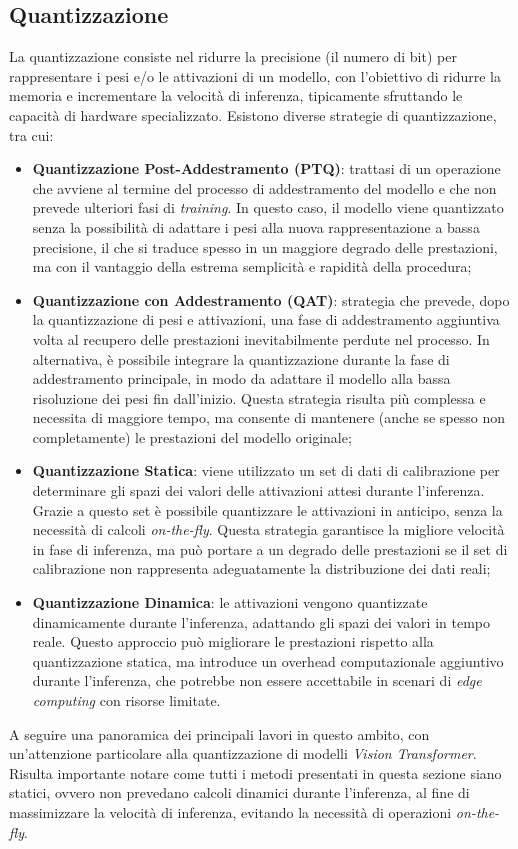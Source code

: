 \subsection{Quantizzazione}
La quantizzazione consiste nel ridurre la precisione (il numero di bit) per
rappresentare i pesi e/o le attivazioni di un modello, con l'obiettivo di
ridurre la memoria e incrementare la velocità di inferenza, tipicamente
sfruttando le capacità di hardware specializzato. Esistono diverse strategie di
quantizzazione, tra cui:
\begin{itemize}
    \item \textbf{Quantizzazione Post-Addestramento (PTQ)}: trattasi di un operazione che avviene al termine del processo di addestramento del modello e che non prevede ulteriori fasi di \textit{training}. In questo caso, il modello viene quantizzato senza la possibilità di adattare i pesi alla nuova rappresentazione a bassa precisione, il che si traduce spesso in un maggiore degrado delle prestazioni, ma con il vantaggio della estrema semplicità e rapidità della procedura;
    \item \textbf{Quantizzazione con Addestramento (QAT)}: strategia che prevede, dopo la quantizzazione di pesi e attivazioni, una fase di addestramento aggiuntiva volta al recupero delle prestazioni inevitabilmente perdute nel processo. In alternativa, è possibile integrare la quantizzazione durante la fase di addestramento principale, in modo da adattare il modello alla bassa risoluzione dei pesi fin dall'inizio. Questa strategia risulta più complessa e necessita di maggiore tempo, ma consente di mantenere (anche se spesso non completamente) le prestazioni del modello originale;
    \item \textbf{Quantizzazione Statica}: viene utilizzato un set di dati di calibrazione per determinare gli spazi dei valori delle attivazioni attesi durante l'inferenza. Grazie a questo set è possibile quantizzare le attivazioni in anticipo, senza la necessità di calcoli \textit{on-the-fly}. Questa strategia garantisce la migliore velocità in fase di inferenza, ma può portare a un degrado delle prestazioni se il set di calibrazione non rappresenta adeguatamente la distribuzione dei dati reali;
    \item \textbf{Quantizzazione Dinamica}: le attivazioni vengono quantizzate dinamicamente durante l'inferenza, adattando gli spazi dei valori in tempo reale. Questo approccio può migliorare le prestazioni rispetto alla quantizzazione statica, ma introduce un overhead computazionale aggiuntivo durante l'inferenza, che potrebbe non essere accettabile in scenari di \textit{edge computing} con risorse limitate.
\end{itemize}
A seguire una panoramica dei principali lavori in questo ambito, con un'attenzione particolare alla quantizzazione di modelli \textit{Vision Transformer}. Risulta importante notare come tutti i metodi presentati in questa sezione siano statici, ovvero non prevedano calcoli dinamici durante l'inferenza, al fine di massimizzare la velocità di inferenza, evitando la necessità di operazioni \textit{on-the-fly}.

